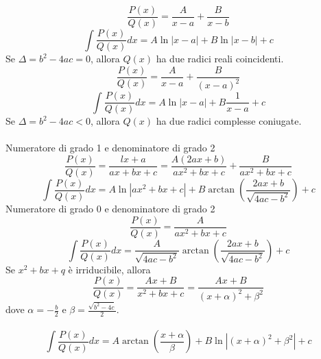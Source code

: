 \documentclass{article}
\begin{document}
\begin{equation*}
    \frac{P(x)}{Q(x)} = \frac{A}{x-a} + \frac{B}{x-b}
\end{equation*}
\begin{equation*}
    \int \frac{P(x)}{Q(x)}dx = A\ln|x-a|+B\ln|x-b|+c
\end{equation*}
Se $\Delta = b^2-4ac = 0$, allora $Q(x)$ ha due radici reali coincidenti.\\
\begin{equation*}
    \frac{P(x)}{Q(x)} = \frac{A}{x-a} + \frac{B}{(x-a)^2}
\end{equation*}
\begin{equation*}
    \int \frac{P(x)}{Q(x)}dx = A\ln|x-a|+B\frac{1}{x-a}+c
\end{equation*}
Se $\Delta = b^2-4ac < 0$, allora $Q(x)$ ha due radici complesse coniugate.\\\\
Numeratore di grado 1 e denominatore di grado 2\\
\begin{equation*}
    \frac{P(x)}{Q(x)} = \frac{lx+a}{ax+bx+c} = \frac{A(2ax+b)}{ax^2+bx+c}+\frac{B}{ax^2+bx+c}
\end{equation*}
\begin{equation*}
    \int \frac{P(x)}{Q(x)}dx = A\ln|ax^2+bx+c|+B\arctan\left(\frac{2ax+b}{\sqrt{4ac-b^2}}\right)+c
\end{equation*}
Numeratore di grado 0 e denominatore di grado 2\\
\begin{equation*}
    \frac{P(x)}{Q(x)} = \frac{A}{ax^2+bx+c}
\end{equation*}
\begin{equation*}
    \int \frac{P(x)}{Q(x)}dx = \frac{A}{\sqrt{4ac-b^2}}\arctan\left(\frac{2ax+b}{\sqrt{4ac-b^2}}\right)+c
\end{equation*}
Se $x^2+bx+q$ è irriducibile, allora
\begin{equation*}
    \frac{P(x)}{Q(x)} = \frac{Ax+B}{x^2+bx+c} = \frac{Ax+B}{(x+\alpha)^2+\beta^2}
\end{equation*}
dove $\alpha = -\frac{b}{2}$ e $\beta = \frac{\sqrt{b^2-4c}}{2}$.\\\\
\begin{equation*}
    \int \frac{P(x)}{Q(x)}dx = A\arctan\left(\frac{x+\alpha}{\beta}\right)+B\ln|(x+\alpha)^2+\beta^2|+c
\end{equation*}
\newpage
\end{document}

